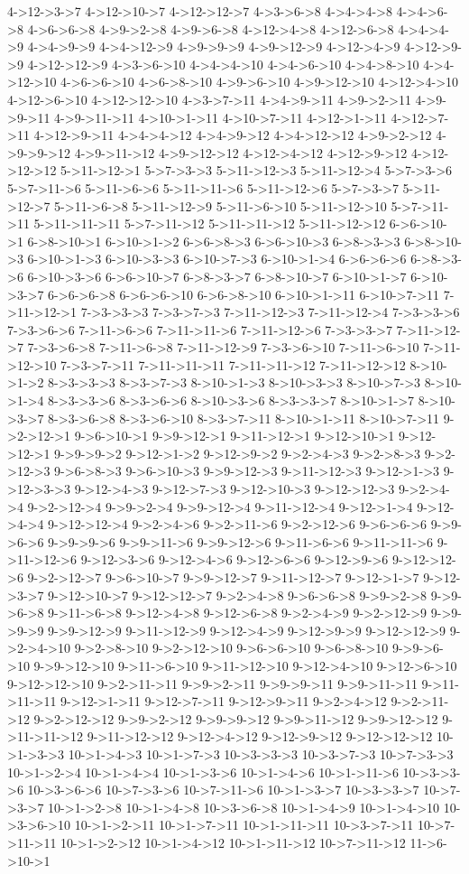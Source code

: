\begin{framed}
{4->12->3->7 4->12->10->7 4->12->12->7 4->3->6->8 4->4->4->8 4->4->6->8 4->6->6->8 4->9->2->8 4->9->6->8 4->12->4->8 4->12->6->8 4->4->4->9 4->4->9->9 4->4->12->9 4->9->9->9 4->9->12->9 4->12->4->9 4->12->9->9 4->12->12->9 4->3->6->10 4->4->4->10 4->4->6->10 4->4->8->10 4->4->12->10 4->6->6->10 4->6->8->10 4->9->6->10 4->9->12->10 4->12->4->10 4->12->6->10 4->12->12->10 4->3->7->11 4->4->9->11 4->9->2->11 4->9->9->11 4->9->11->11 4->10->1->11 4->10->7->11 4->12->1->11 4->12->7->11 4->12->9->11 4->4->4->12 4->4->9->12 4->4->12->12 4->9->2->12 4->9->9->12 4->9->11->12 4->9->12->12 4->12->4->12 4->12->9->12 4->12->12->12 5->11->12->1 5->7->3->3 5->11->12->3 5->11->12->4 5->7->3->6 5->7->11->6 5->11->6->6 5->11->11->6 5->11->12->6 5->7->3->7 5->11->12->7 5->11->6->8 5->11->12->9 5->11->6->10 5->11->12->10 5->7->11->11 5->11->11->11 5->7->11->12 5->11->11->12 5->11->12->12 6->6->10->1 6->8->10->1 6->10->1->2 6->6->8->3 6->6->10->3 6->8->3->3 6->8->10->3 6->10->1->3 6->10->3->3 6->10->7->3 6->10->1->4 6->6->6->6 6->8->3->6 6->10->3->6 6->6->10->7 6->8->3->7 6->8->10->7 6->10->1->7 6->10->3->7 6->6->6->8 6->6->6->10 6->6->8->10 6->10->1->11 6->10->7->11 7->11->12->1 7->3->3->3 7->3->7->3 7->11->12->3 7->11->12->4 7->3->3->6 7->3->6->6 7->11->6->6 7->11->11->6 7->11->12->6 7->3->3->7 7->11->12->7 7->3->6->8 7->11->6->8 7->11->12->9 7->3->6->10 7->11->6->10 7->11->12->10 7->3->7->11 7->11->11->11 7->11->11->12 7->11->12->12 8->10->1->2 8->3->3->3 8->3->7->3 8->10->1->3 8->10->3->3 8->10->7->3 8->10->1->4 8->3->3->6 8->3->6->6 8->10->3->6 8->3->3->7 8->10->1->7 8->10->3->7 8->3->6->8 8->3->6->10 8->3->7->11 8->10->1->11 8->10->7->11 9->2->12->1 9->6->10->1 9->9->12->1 9->11->12->1 9->12->10->1 9->12->12->1 9->9->9->2 9->12->1->2 9->12->9->2 9->2->4->3 9->2->8->3 9->2->12->3 9->6->8->3 9->6->10->3 9->9->12->3 9->11->12->3 9->12->1->3 9->12->3->3 9->12->4->3 9->12->7->3 9->12->10->3 9->12->12->3 9->2->4->4 9->2->12->4 9->9->2->4 9->9->12->4 9->11->12->4 9->12->1->4 9->12->4->4 9->12->12->4 9->2->4->6 9->2->11->6 9->2->12->6 9->6->6->6 9->9->6->6 9->9->9->6 9->9->11->6 9->9->12->6 9->11->6->6 9->11->11->6 9->11->12->6 9->12->3->6 9->12->4->6 9->12->6->6 9->12->9->6 9->12->12->6 9->2->12->7 9->6->10->7 9->9->12->7 9->11->12->7 9->12->1->7 9->12->3->7 9->12->10->7 9->12->12->7 9->2->4->8 9->6->6->8 9->9->2->8 9->9->6->8 9->11->6->8 9->12->4->8 9->12->6->8 9->2->4->9 9->2->12->9 9->9->9->9 9->9->12->9 9->11->12->9 9->12->4->9 9->12->9->9 9->12->12->9 9->2->4->10 9->2->8->10 9->2->12->10 9->6->6->10 9->6->8->10 9->9->6->10 9->9->12->10 9->11->6->10 9->11->12->10 9->12->4->10 9->12->6->10 9->12->12->10 9->2->11->11 9->9->2->11 9->9->9->11 9->9->11->11 9->11->11->11 9->12->1->11 9->12->7->11 9->12->9->11 9->2->4->12 9->2->11->12 9->2->12->12 9->9->2->12 9->9->9->12 9->9->11->12 9->9->12->12 9->11->11->12 9->11->12->12 9->12->4->12 9->12->9->12 9->12->12->12 10->1->3->3 10->1->4->3 10->1->7->3 10->3->3->3 10->3->7->3 10->7->3->3 10->1->2->4 10->1->4->4 10->1->3->6 10->1->4->6 10->1->11->6 10->3->3->6 10->3->6->6 10->7->3->6 10->7->11->6 10->1->3->7 10->3->3->7 10->7->3->7 10->1->2->8 10->1->4->8 10->3->6->8 10->1->4->9 10->1->4->10 10->3->6->10 10->1->2->11 10->1->7->11 10->1->11->11 10->3->7->11 10->7->11->11 10->1->2->12 10->1->4->12 10->1->11->12 10->7->11->12 11->6->10->1 }
\end{framed}
